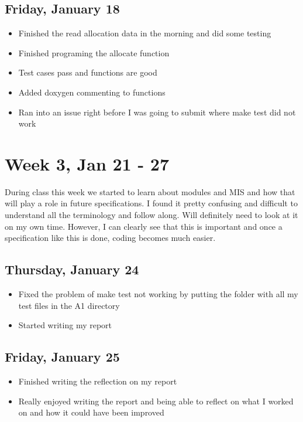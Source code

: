 \documentclass{article}
\begin{document}
\subsection{Friday, January 18}
\begin{itemize}
    \item Finished the read allocation data in the morning and did some testing
    \item Finished programing the allocate function
    \item Test cases pass and functions are good
    \item Added doxygen commenting to functions
    \item Ran into an issue right before I was going to submit where make test did not work
\end{itemize}

\section{Week 3, Jan 21 - 27}

During class this week we started to learn about modules and MIS and how that will play a role in future specifications. I found it pretty confusing and difficult to understand all the terminology and follow along. Will definitely need to look at it on my own time. However, I can clearly see that this is important and once a specification like this is done, coding becomes much easier.

\subsection{Thursday, January 24}
\begin{itemize}
    \item Fixed the problem of make test not working by putting the folder with all my test files in the A1 directory
    \item Started writing my report
\end{itemize}

\subsection{Friday, January 25}
\begin{itemize}
    \item Finished writing the reflection on my report
    \item Really enjoyed writing the report and being able to reflect on what I worked on and how it could have been improved
\end{itemize}
\end{document}
